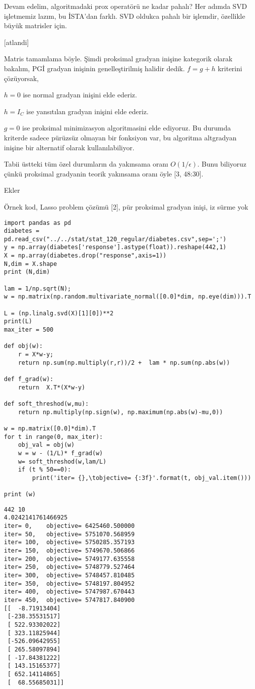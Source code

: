 \documentclass[12pt,fleqn]{article}\usepackage{../../common}
\begin{document}
Devam edelim, algoritmadaki prox operatörü ne kadar pahalı? Her adımda SVD
işletmemiz lazım, bu İSTA'dan farklı. SVD oldukca pahalı bir işlemdir,
özellikle büyük matrisler için. 

[atlandi]

Matris tamamlama böyle. Şimdi proksimal gradyan inişine kategorik olarak
bakalım, PGİ gradyan inişinin genelleştirilmiş halidir dedik. $f = g + h$
kriterini çözüyorsak, 

$h=0$ ise normal gradyan inişini elde ederiz. 

$h = I_C$ ise yansıtılan gradyan inişini elde ederiz. 

$g=0$ ise proksimal minimizasyon algoritmasini elde ediyoruz. Bu durumda
kriterde sadece pürüzsüz olmayan bir fonksiyon var, bu algoritma altgradyan
inişine bir alternatif olarak kullanılabiliyor. 

Tabii üstteki tüm özel durumların da yakınsama oranı $O(1/\epsilon)$. Bunu
biliyoruz çünkü proksimal gradyanin teorik yakınsama oranı öyle [3,
48:30]. 

Ekler

Örnek kod, Lasso problem çözümü [2], pür proksimal gradyan inişi, iz sürme yok

\begin{verbatim}
import pandas as pd
diabetes = pd.read_csv("../../stat/stat_120_regular/diabetes.csv",sep=';')
y = np.array(diabetes['response'].astype(float)).reshape(442,1)
X = np.array(diabetes.drop("response",axis=1))
N,dim = X.shape
print (N,dim)

lam = 1/np.sqrt(N);
w = np.matrix(np.random.multivariate_normal([0.0]*dim, np.eye(dim))).T

L = (np.linalg.svd(X)[1][0])**2
print(L)
max_iter = 500

def obj(w):
    r = X*w-y;
    return np.sum(np.multiply(r,r))/2 +  lam * np.sum(np.abs(w))

def f_grad(w):
    return  X.T*(X*w-y) 

def soft_threshod(w,mu):
    return np.multiply(np.sign(w), np.maximum(np.abs(w)-mu,0))  

w = np.matrix([0.0]*dim).T
for t in range(0, max_iter):
    obj_val = obj(w)
    w = w - (1/L)* f_grad(w)
    w= soft_threshod(w,lam/L)    
    if (t % 50==0):
        print('iter= {},\tobjective= {:3f}'.format(t, obj_val.item()))

print (w)
\end{verbatim}

\begin{verbatim}
442 10
4.0242141761466925
iter= 0,	objective= 6425460.500000
iter= 50,	objective= 5751070.568959
iter= 100,	objective= 5750285.357193
iter= 150,	objective= 5749670.506866
iter= 200,	objective= 5749177.635558
iter= 250,	objective= 5748779.527464
iter= 300,	objective= 5748457.810485
iter= 350,	objective= 5748197.804952
iter= 400,	objective= 5747987.670443
iter= 450,	objective= 5747817.840900
[[  -8.71913404]
 [-238.35531517]
 [ 522.93302022]
 [ 323.11825944]
 [-526.09642955]
 [ 265.58097894]
 [ -17.84381222]
 [ 143.15165377]
 [ 652.14114865]
 [  68.55685031]]
\end{verbatim}
\end{document}
